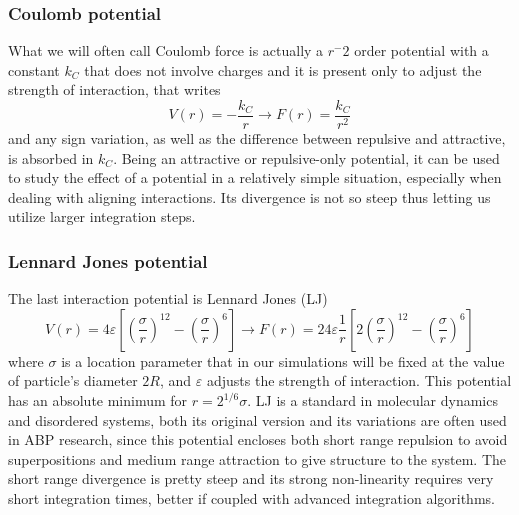 \documentclass[../../master_thesis_np.tex]{subfiles}
\begin{document}
	\subsubsection{Coulomb potential}
	What we will often call Coulomb force is actually a $r^-2$ order potential with a constant $k_C$ that does not involve charges and it is present only to adjust the strength of interaction, that writes
	\begin{equation}
		V(r) = -\frac{k_C}{r} \rightarrow F(r) = \frac{k_C}{r^2}
	\end{equation} 
	and any sign variation, as well as the difference between repulsive and attractive, is absorbed in $k_C$.
	Being an attractive or repulsive-only potential, it can be used to study the effect of a potential in a relatively simple situation, especially when dealing with aligning interactions.
	Its divergence is not so steep thus letting us utilize larger integration steps.

	\subsubsection{Lennard Jones potential}
	The last interaction potential is Lennard Jones (LJ)
	\begin{equation}
		V(r) = 4\varepsilon \left[ \left(\frac{\sigma}{r}\right)^{12} - \left(\frac{\sigma}{r}\right)^{6} \right] \rightarrow F(r) = 24\varepsilon \frac{1}{r}\left[ 2 \left(\frac{\sigma}{r}\right)^{12}  - \left(\frac{\sigma}{r}\right)^{6} \right]
	\end{equation}
	where $\sigma$ is a location parameter that in our simulations will be fixed at the value of particle's diameter $2R$, and $\varepsilon$ adjusts the strength of interaction. 
	This potential has an absolute minimum for $r = 2^{1/6}\sigma$.
	LJ is a standard in molecular dynamics and disordered systems, both its original version and its variations are often used in ABP research, since this potential encloses both short range repulsion to avoid superpositions and medium range attraction to give structure to the system.
	The short range divergence is pretty steep and its strong non-linearity requires very short integration times, better if coupled with advanced integration algorithms.
	
\end{document}
